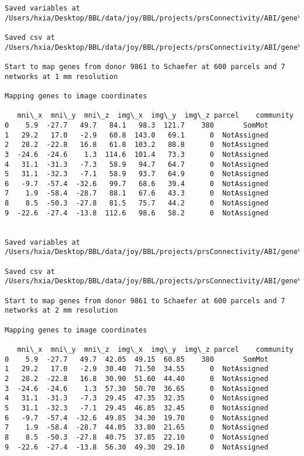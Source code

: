 \documentclass[11pt]{article}
\begin{document}
\begin{Verbatim}[commandchars=\\\{\}]
Saved variables at /Users/hxia/Desktop/BBL/data/joy/BBL/projects/prsConnectivity/ABI/gene\_mapping/9861donor\_400Parcels\_17Network\_2mm.pkl

Saved csv at /Users/hxia/Desktop/BBL/data/joy/BBL/projects/prsConnectivity/ABI/gene\_mapping/9861donor\_400Parcels\_17Network\_2mm.csv

Start to map genes from donor 9861 to Schaefer at 600 parcels and 7 networks at 1 mm resolution

Mapping genes to image coordinates

   mni\_x  mni\_y  mni\_z  img\_x  img\_y  img\_z parcel    community
0    5.9  -27.7   49.7   84.1   98.3  121.7    380       SomMot
1   29.2   17.0   -2.9   60.8  143.0   69.1      0  NotAssigned
2   28.2  -22.8   16.8   61.8  103.2   88.8      0  NotAssigned
3  -24.6  -24.6    1.3  114.6  101.4   73.3      0  NotAssigned
4   31.1  -31.3   -7.3   58.9   94.7   64.7      0  NotAssigned
5   31.1  -32.3   -7.1   58.9   93.7   64.9      0  NotAssigned
6   -9.7  -57.4  -32.6   99.7   68.6   39.4      0  NotAssigned
7    1.9  -58.4  -28.7   88.1   67.6   43.3      0  NotAssigned
8    8.5  -50.3  -27.8   81.5   75.7   44.2      0  NotAssigned
9  -22.6  -27.4  -13.8  112.6   98.6   58.2      0  NotAssigned


Saved variables at /Users/hxia/Desktop/BBL/data/joy/BBL/projects/prsConnectivity/ABI/gene\_mapping/9861donor\_600Parcels\_7Network\_1mm.pkl

Saved csv at /Users/hxia/Desktop/BBL/data/joy/BBL/projects/prsConnectivity/ABI/gene\_mapping/9861donor\_600Parcels\_7Network\_1mm.csv

Start to map genes from donor 9861 to Schaefer at 600 parcels and 7 networks at 2 mm resolution

Mapping genes to image coordinates

   mni\_x  mni\_y  mni\_z  img\_x  img\_y  img\_z parcel    community
0    5.9  -27.7   49.7  42.05  49.15  60.85    380       SomMot
1   29.2   17.0   -2.9  30.40  71.50  34.55      0  NotAssigned
2   28.2  -22.8   16.8  30.90  51.60  44.40      0  NotAssigned
3  -24.6  -24.6    1.3  57.30  50.70  36.65      0  NotAssigned
4   31.1  -31.3   -7.3  29.45  47.35  32.35      0  NotAssigned
5   31.1  -32.3   -7.1  29.45  46.85  32.45      0  NotAssigned
6   -9.7  -57.4  -32.6  49.85  34.30  19.70      0  NotAssigned
7    1.9  -58.4  -28.7  44.05  33.80  21.65      0  NotAssigned
8    8.5  -50.3  -27.8  40.75  37.85  22.10      0  NotAssigned
9  -22.6  -27.4  -13.8  56.30  49.30  29.10      0  NotAssigned



\end{Verbatim}
\end{document}
